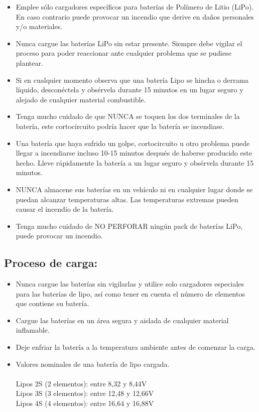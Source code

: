 \documentclass[user_manual.tex]{subfiles}
\begin{document}
\begin{itemize}

    \item Emplee sólo cargadores específicos para baterías de Polímero de Litio (LiPo). En caso contrario puede provocar un 
    incendio que derive en daños personales y/o materiales.
    \item Nunca cargue las baterías LiPo sin estar presente. Siempre debe vigilar el proceso para poder reaccionar ante cualquier
    problema que se pudiese plantear.
    \item Si en cualquier momento observa que una batería Lipo se hincha o derrama líquido, desconéctela y obsérvela durante 15
    minutos en un lugar seguro y alejado de cualquier material combustible.
    \item Tenga mucho cuidado de que NUNCA se toquen los dos terminales de la batería, este cortocircuito podría hacer que la 
    batería se incendiase.
    \item Una batería que haya sufrido un golpe, cortocircuito u otro problema puede llegar a incendiarse incluso 10-15 minutos 
    después de haberse producido este hecho. Lleve rápidamente la batería a un lugar seguro y obsérvela durante 15 minutos.
    \item NUNCA almacene sus baterías en un vehículo ni en cualquier lugar donde se puedan alcanzar temperaturas altas. Las 
    temperaturas extremas pueden causar el incendio de la batería.
    \item Tenga mucho cuidado de NO PERFORAR ningún pack de baterías LiPo, puede provocar un incendio.
    \end{itemize}
    
\subsection{Proceso de carga:}
\begin{itemize}
 \item  Nunca cargue las baterías sin vigilarlas y utilice solo cargadores especiales para las baterías de lipo, así como tener
    en cuenta el número de elementos que contiene su batería.
 \item Cargue las baterías en un área segura y aislada de cualquier material inflamable.
 \item Deje enfriar la batería a la temperatura ambiente antes de comenzar la carga.
 \item Valores nominales de una batería de lipo cargada.\\
 \\
    Lipos 2S (2 elementos): entre 8,32 y 8,44V\\
    Lipos 3S (3 elementos): entre 12,48 y 12,66V\\
    Lipos 4S (4 elementos): entre 16,64 y 16,88V\\
\end{itemize}   
\end{document}
